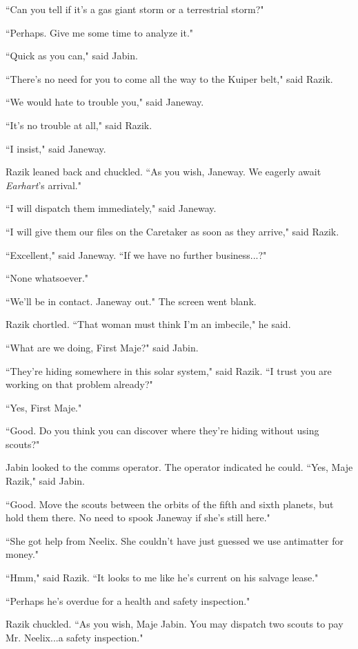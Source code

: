 \documentclass[twoside,letterpaper,12pt]{memoir}
\begin{document}
``Can you tell if it's a gas giant storm or a terrestrial storm?"

``Perhaps. Give me some time to analyze it."

``Quick as you can," said Jabin.

``There's no need for you to come all the way to the Kuiper belt," said Razik.

``We would hate to trouble you," said Janeway.

``It's no trouble at all," said Razik.

``I insist," said Janeway.

Razik leaned back and chuckled. ``As you wish, Janeway. We eagerly await \textit{Earhart}'s arrival."

``I will dispatch them immediately," said Janeway.

``I will give them our files on the Caretaker as soon as they arrive," said Razik.

``Excellent," said Janeway. ``If we have no further business...?"

``None whatsoever."

``We'll be in contact. Janeway out." The screen went blank.

Razik chortled. ``That woman must think I’m an imbecile," he said.

``What are we doing, First Maje?" said Jabin.

``They're hiding somewhere in this solar system," said Razik. ``I trust you are working on that problem already?"

``Yes, First Maje."

``Good. Do you think you can discover where they're hiding without using scouts?"

Jabin looked to the comms operator. The operator indicated he could. ``Yes, Maje Razik," said Jabin.

``Good. Move the scouts between the orbits of the fifth and sixth planets, but hold them there. No need to spook Janeway if she's still here."

``She got help from Neelix. She couldn't have just guessed we use antimatter for money."

``Hmm," said Razik. ``It looks to me like he's current on his salvage lease."

``Perhaps he's overdue for a health and safety inspection."

Razik chuckled. ``As you wish, Maje Jabin. You may dispatch two scouts to pay Mr. Neelix...a safety inspection."
\end{document}
